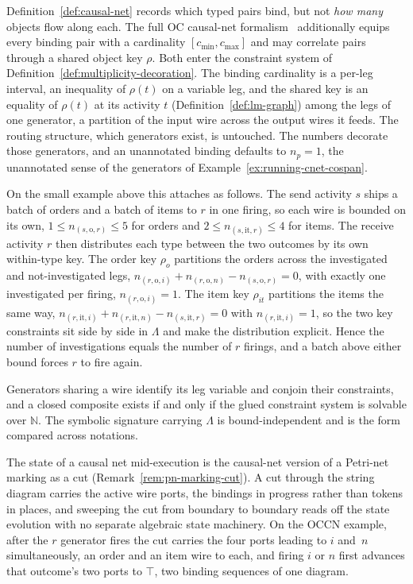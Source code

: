 \begin{remark}
  \label{rem:cnet-binding-numbers}
  Definition~\ref{def:causal-net} records which typed pairs bind, but not
  \emph{how many} objects flow along each. The full OC causal-net
  formalism~\cite{lissObjectCentricCausalNets2025} additionally equips every
  binding pair with a cardinality $[c_{\min},c_{\max}]$ and may correlate
  pairs through a shared object key $\rho$. Both enter the constraint system of
  Definition~\ref{def:multiplicity-decoration}. The binding cardinality is a
  per-leg interval, an inequality of $\rho(t)$ on a variable leg, and the shared key is an equality of $\rho(t)$ at its activity $t$ (Definition~\ref{def:lm-graph})
  among the legs of one generator, a partition of the input wire across the output wires it feeds.
  The routing
  structure, which generators exist, is untouched. The numbers decorate those
  generators, and an unannotated binding defaults to $n_p=1$, the unannotated sense of the
  generators of Example~\ref{ex:running-cnet-cospan}.

  On the small example above this attaches as follows. The send activity $s$ ships
  a batch of orders and a batch of items to $r$ in one firing, so each wire is bounded on its own,
  $1\le n_{(s,\mathrm{o},r)}\le 5$ for orders and $2\le n_{(s,\mathrm{it},r)}\le 4$ for items. The receive activity $r$
  then distributes each type between the two outcomes by its own within-type key. The order key
  $\rho_{o}$ partitions the orders across the investigated and not-investigated legs,
  $n_{(r,\mathrm{o},i)}+n_{(r,\mathrm{o},n)}-n_{(s,\mathrm{o},r)}=0$, with exactly one investigated
  per firing, $n_{(r,\mathrm{o},i)}=1$. The item key $\rho_{it}$ partitions the items the
  same way, $n_{(r,\mathrm{it},i)}+n_{(r,\mathrm{it},n)}-n_{(s,\mathrm{it},r)}=0$ with
  $n_{(r,\mathrm{it},i)}=1$, so the two key constraints sit side by side in $\Lambda$ and make the
  distribution explicit. Hence the number of investigations equals the number of $r$ firings, and a
  batch above either bound forces $r$ to fire again.

  Generators sharing a wire identify its leg variable and conjoin their
  constraints, and a closed composite exists if and only if the glued constraint system is
  solvable over $\mathbb{N}$. The symbolic signature carrying
  $\Lambda$ is bound-independent and is the form compared across notations.
\end{remark}

\begin{remark}
  The state of a causal net mid-execution is the causal-net version of a Petri-net
  marking as a cut (Remark~\ref{rem:pn-marking-cut}). A cut through the string diagram
  carries the active wire ports, the bindings in progress rather than tokens in places,
  and sweeping the cut from boundary to boundary reads off the state evolution with no
  separate algebraic state machinery. On the OCCN example, after the $r$ generator fires
  the cut carries the four ports leading to $i$ and~$n$ simultaneously, an order and an item wire to each, and firing
  $i$ or $n$ first advances that outcome's two ports to $\top$, two binding sequences of one
  diagram.
\end{remark}
